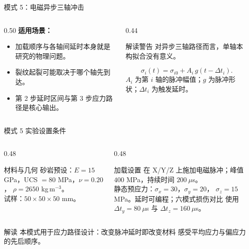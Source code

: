 \documentclass[11pt,aspectratio=169]{beamer}
\newcommand{\cncue}[1]{{\footnotesize\color{TUSTmidgray} #1}}
\begin{document}
\begin{frame}{模式 5：电磁异步三轴冲击}
  \begin{columns}[T,onlytextwidth]
    \begin{column}{0.50\textwidth}
      \textbf{适用场景：}
      \begin{itemize}
        \item 加载顺序与各轴间延时本身就是研究的物理问题。
        \item 裂纹起裂可能取决于哪个轴先到达。
        \item 第 2 步延时区间与第 3 步应力路径是核心输出。
      \end{itemize}
    \end{column}
    \begin{column}{0.44\textwidth}
      \begin{alertblock}{解读警告}
        对异步三轴路径而言，单轴本构拟合没有意义。
      \end{alertblock}
      \[
        \sigma_i(t)=\sigma_{i0}+A_i\,g(t-\Delta t_i).
      \]
      \cncue{$A_i$ 为第 $i$ 轴的脉冲幅值；$g$ 为脉冲形状；$\Delta t_i$ 为触发延时。}
    \end{column}
  \end{columns}
\end{frame}

\begin{frame}{模式 5 实验设置条件}
  \small
  \begin{columns}[T,onlytextwidth]
    \begin{column}{0.48\textwidth}
      \begin{block}{材料与几何}
        砂岩预设：$E=15$ GPa，UCS $=80$ MPa，$\nu=0.20$，
        $\rho=2650$ kg\,m$^{-3}$。\\[3pt]
        试样：$50\times50\times50$ mm。
      \end{block}
    \end{column}
    \begin{column}{0.48\textwidth}
      \begin{exampleblock}{加载设置}
        在 X/Y/Z 上施加电磁脉冲；峰值 $400$ MPa，持续时间 $200~\mu$s。\\[3pt]
        静态预应力：$\sigma_x=30$，$\sigma_y=20$，
        $\sigma_z=15$ MPa。延时可编程；六模式损伤对比
        使用 $\Delta t_y=80~\mu$s 与 $\Delta t_z=160~\mu$s。
      \end{exampleblock}
    \end{column}
  \end{columns}
  \vspace{0.2cm}
  \begin{block}{解读}
    本模式用于应力路径设计：改变脉冲延时即改变材料
    感受平均应力与偏应力的先后顺序。
  \end{block}
\end{frame}
\end{document}
